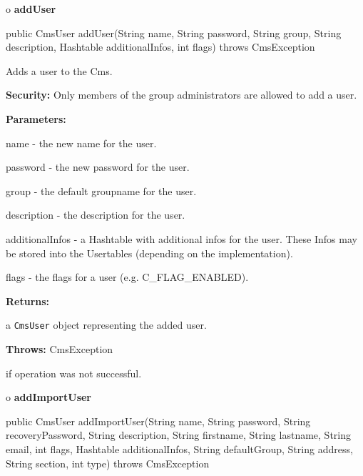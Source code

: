 o {\bf addUser} 

\begin{PRE}
 public CmsUser addUser(String name,
                        String password,
                        String group,
                        String description,
                        Hashtable additionalInfos,
                        int flags) throws CmsException
\end{PRE}

\begin{description}
\htmlDD Adds a user to the Cms. 

{\bf Security:} Only members of the group administrators are allowed to add a
user. 

\begin{description}
\item {\bf Parameters:}  

name - the new name for the user.  

password - the new password for the user.  

group - the default groupname for the user.  

description - the description for the user.  

additionalInfos - a Hashtable with additional infos for the user. These Infos
may be stored into the Usertables (depending on the implementation).  

flags - the flags for a user (e.g. C\_FLAG\_ENABLED).  
\item {\bf Returns:}  

a {\tt CmsUser} object representing the added user.  
\item {\bf Throws:} CmsException  

if operation was not successful.  
\end{description}

\end{description}

o {\bf addImportUser} 

\begin{PRE}
 public CmsUser addImportUser(String name,
                              String password,
                              String recoveryPassword,
                              String description,
                              String firstname,
                              String lastname,
                              String email,
                              int flags,
                              Hashtable additionalInfos,
                              String defaultGroup,
                              String address,
                              String section,
                              int type) throws CmsException
\end{PRE}

